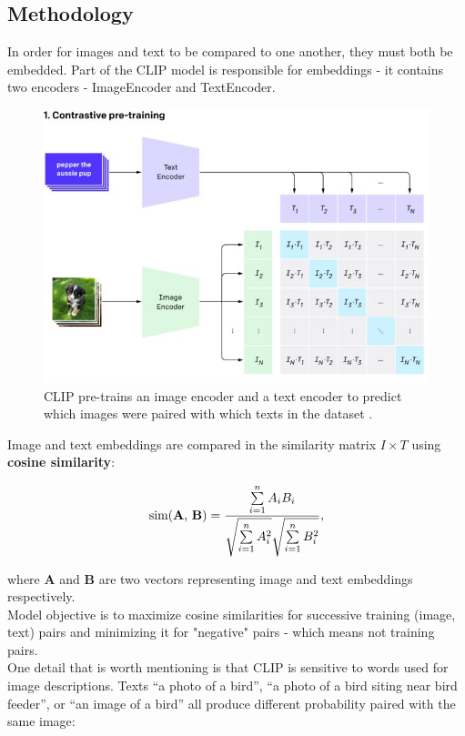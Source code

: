 \documentclass[12pt,a4paper,openany]{book}
\begin{document}
\subsection{Methodology}
\noindent In order for images and text to be compared to one another, they must both be embedded.  Part of the CLIP model is responsible for embeddings -  it contains two encoders - ImageEncoder and TextEncoder.
 \begin{figure}[ht!]
     \centering
     \includegraphics[scale=0.4]{figs/clip_model_1.jpeg}
     \caption{CLIP pre-trains an image encoder and a text encoder to predict which images were paired with which texts in the dataset \cite{clip_blog}.  }
 \end{figure}
 \newline
\noindent Image and text embeddings are compared in the similarity matrix $I \times T$ using \textbf{cosine similarity}:

\begin{equation}
\text{sim(\textbf{A}, \textbf{B})} = \frac{ \sum\limits_{i=1}^{n}{A_i  B_i} }{ \sqrt{\sum\limits_{i=1}^{n}{A_i^2}}  \sqrt{\sum\limits_{i=1}^{n}{B_i^2}} },
\end{equation}

\noindent where \textbf{A} and \textbf{B} are two vectors representing image and text embeddings respectively. \\
\noindent Model objective is to maximize cosine similarities for successive training (image, text) pairs and minimizing it for "negative" pairs - which means not training pairs. \\
One detail that is worth mentioning is that CLIP is sensitive to words used for image descriptions. Texts “a photo of a bird”, “a photo of a bird siting near bird feeder”, or “an image of a bird” all produce different probability paired with the same image:
\end{document}
